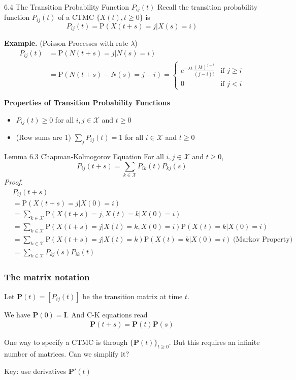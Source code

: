 \documentclass[letterpaper,handout, mathserif]{beamer}
\def\p{\mathrm P}
\def\X{\mathcal{X}}
\begin{document}
\begin{frame}{6.4 The Transition Probability Function $P_{ij}(t)$}
Recall the transition probability function $P_{ij}(t)$ of a CTMC $\{X(t),t\ge 0\}$ is
$$P_{ij}(t)=\p(X(t+s)=j|X(s)=i)$$

\textbf{Example.} (Poisson Processes with rate $\lambda$)
\begin{align*}
P_{ij}(t)&=\p(N(t+s)=j|N(s)=i)\\
&=\p(N(t+s)-N(s)=j-i)
=\begin{cases}
e^{-\lambda{t}}\frac{(\lambda t)^{j-i}}{(j-i)!} & \mbox{if }j\ge i\\
0&\mbox{if }j<i
\end{cases}
\end{align*}

\textbf{Properties of Transition Probability Functions}
\begin{itemize}
\item $P_{ij}(t)\ge 0$ for all $i,j\in\X$ and $t\ge 0$
\item (Row sums are 1) $\sum_j P_{ij}(t)=1$ for all $i\in\X$ and $t\ge 0$
\end{itemize}
\end{frame}

\begin{frame}{Lemma 6.3 Chapman-Kolmogorov Equation}
For all $i,j\in\X$ and $t\ge 0$,
$$P_{ij}(t+s)=\sum_{k\in\X} P_{ik}(t)P_{kj}(s)$$
{\em Proof.}\small
\begin{align*}
&P_{ij} (t +s)\\
&= \p(X(t + s) = j |X(0) = i)\\
&=\sum_{k\in\X}\p(X(t + s) = j,X(t) = k|X(0) = i)\\
&=\sum_{k\in\X}\p(X(t + s) = j |X(t) = k,X(0) = i)\p(X(t) = k|X(0) = i)\\
&=\sum_{k\in\X}\p(X(t + s) = j |X(t) = k)\p(X(t) = k|X(0) = i)\;\mbox{(Markov Property)}\\
&=\sum_{k\in\X}P_{kj} (s)P_{ik}(t)
\end{align*}
\end{frame}


\begin{frame}
	\frametitle{The matrix notation}
	
	Let $\mathbf{P}(t) = [P_{ij}(t)]$ be the transition matrix at time $t$. 
	
	We have $\mathbf{P}(0) = \mathbf{I}$.
	And C-K equations read
	\begin{align*}
		\mathbf{P} (t+s) = \mathbf{P} (t) \mathbf{P}(s)
	\end{align*}
	
	\vfill
	One way to specify a CTMC is through $\{ \mathbf{P}(t) \}_{ t \geq 0}$. But 
	this requires an infinite number of matrices. Can we simplify it?
	
	\vfill
	Key: use derivatives $\mathbf{P}'(t)$
\end{frame}
\end{document}
